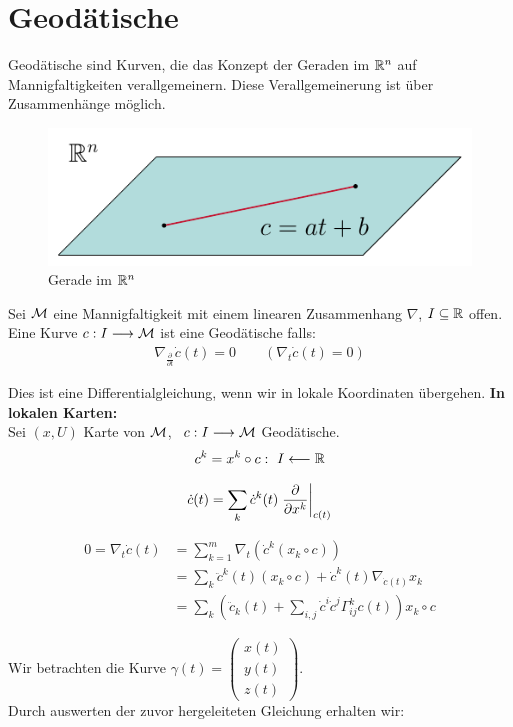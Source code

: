 \chapter{Geodätische}
Geodätische sind Kurven, die das Konzept der Geraden im $\mathbb{R}^n$ auf Mannigfaltigkeiten verallgemeinern.
Diese Verallgemeinerung ist über Zusammenhänge möglich.
\begin{figure}[H]
\centering
\includegraphics[width=0.6\linewidth]{figures/tikz/linern.pdf}
\caption{Gerade im $\mathbb{R}^n$}
\label{img:linern}
\end{figure} 
\begin{defs}[Geodätische]
Sei $\mathcal{M}$ eine Mannigfaltigkeit mit einem linearen Zusammenhang $\nabla$, $I \subseteq \mathbb{R}$ offen. Eine Kurve $c: I \longrightarrow \mathcal{M}$ ist eine Geodätische falls:
\begin{align} 
\label{eq:variation}
\nabla_{\frac{\partial}{\partial t}} \dot{c}(t) = 0 \qquad (\nabla_t \dot{c}(t) = 0)
\end{align}
\end{defs}
Dies ist eine Differentialgleichung, wenn wir in lokale Koordinaten übergehen.
\textbf{In lokalen Karten:} \\
Sei $(x,U)$ Karte von $\mathcal{M}$, \ $c: I \longrightarrow \mathcal{M}$ Geodätische. 
\begin{align}
c^k = x^k \circ c: \ I \longleftarrow \mathbb{R}
\end{align}

\begin{align}
\dot{c}(t) = \sum_k \dot{c}^k(t) \eval{\frac{\partial}{\partial x^k}}_{c(t)}
\end{align}

\begin{align*}
0=\nabla_t\dot{c}(t) &= \sum_{k=1}^{m}\nabla_t(\dot{c}^k(x_k\circ c)) \\
							   &= \sum_k \ddot{c}^k(t)(x_k\circ c) + \dot{c}^k(t)\nabla_{\dot{c}(t)}x_k \\
							   &= \sum_k \left(\ddot{c}_k(t) + \sum_{i,j}\dot{c}^{i}\dot{c}^j \Gamma_{ij}^k c(t)\right) x_k \circ c
\end{align*}

Wir betrachten die Kurve $\gamma(t)= \begin{pmatrix}
x(t) \\ y(t) \\z(t) \end{pmatrix}$. \\

Durch auswerten der zuvor hergeleiteten Gleichung erhalten wir:



